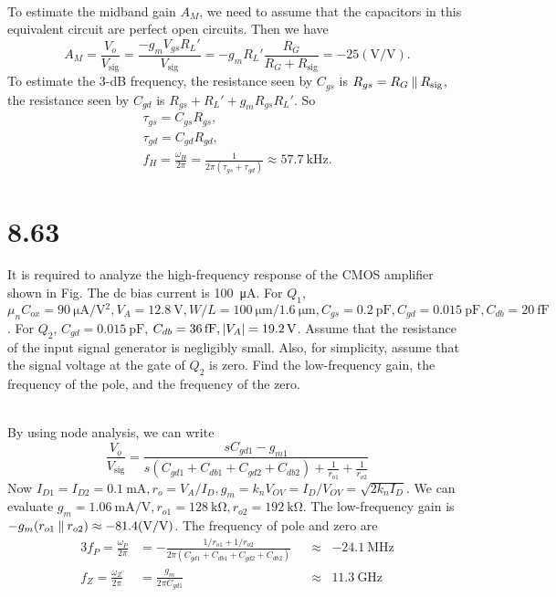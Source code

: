 \documentclass[12pt, a4paper]{article}
\begin{document}
\Ans \\
To estimate the midband gain $A_M$, we need to assume that the capacitors
in this equivalent circuit are perfect open circuits. Then we have
\[
  A_M = \frac{V_o}{V_\text{sig}}
  = \frac{-g_mV_{gs}R_L'}{V_\text{sig}}
  = -g_mR_L' \frac{R_G}{R_G+R_\text{sig}}
  = -25 (\si{\V/\V}).
\]
To estimate the 3-dB frequency, the resistance seen by
$C_{gs}$ is $R_{gs} = R_G \mathbin{\|} R_\text{sig}$, the resistance
seen by $C_{gd}$ is $R_{gs} + R_L' + g_mR_{gs}R_L'$. So
\begin{gather*}
  \tau_{gs} = C_{gs}R_{gs}, \\
  \tau_{gd} = C_{gd}R_{gd}, \\
  f_H = \frac{\omega_H}{2\pi} = \frac{1}{2\pi (\tau_{gs}+\tau_{gd})}
  \approx \SI{57.7}{\kHz}.
\end{gather*}

\section{8.63}
It is required to analyze the high-frequency response of the CMOS amplifier
shown in Fig. The dc bias current is \SI{100}{\uA}.
For $Q_1$, $\mu_nC_{ox} = \SI{90}{\uA/\V^2}, V_A = \SI{12.8}{\V},
W/L = \SI{100}{\um}/\SI{1.6}{\um}, C_{gs} = \SI{0.2}{\pF},
C_{gd} = \SI{0.015}{\pF}, C_{db} = \SI{20}{\fF}$. For $Q_2$,
$C_{gd} = \SI{0.015}{\pF}$, $C_{db} = \SI{36}{\fF}, \abs{V_A} = \SI{19.2}{\V}$.
Assume that the resistance of the input signal generator is negligibly small.
Also, for simplicity, assume that the signal voltage at the gate of $Q_2$
is zero. Find the low-frequency gain, the frequency of the pole, and the
frequency of the zero.

\Ans \\
By using node analysis, we can write
\[
  \frac{V_o}{V_\text{sig}} =
  \frac{sC_{gd1} - g_{m1}}{s(C_{gd1}+C_{db1}+C_{gd2}+C_{db2}) +
  \frac{1}{r_{o1}}+\frac{1}{r_{o2}}}
\]
Now $I_{D1} = I_{D2} = \SI{0.1}{\mA}, r_o = V_A/I_D,
g_m = k_nV_{OV} = I_D/V_{OV} = \sqrt{2k_nI_D}$. We can evaluate
$g_m = \SI{1.06}{\mA/\V}, r_{o1} = \SI{128}{\kohm}, r_{o2} = \SI{192}{\kohm}$.
The low-frequency gain is
$-g_m(r_{o1} \paral r_{o2})\approx -81.4(\si{\V/\V})$. The frequency of pole
and zero are
\begin{alignat*}{3}
  f_P = \frac{\omega_P}{2\pi} &=
  -\frac{1/r_{o1}+1/r_{o2}}{2\pi (C_{gd1}+C_{db1}+C_{gd2}+C_{db2})}
  && \approx & -\SI{24.1}{\MHz} \\
  f_Z = \frac{\omega_Z}{2\pi} &= \frac{g_m}{2\pi C_{gd1}}
  && \approx & \SI{11.3}{\GHz}
\end{alignat*}
\end{document}
